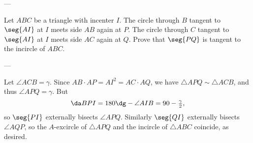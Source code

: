 
---

Let $ABC$ be a triangle with incenter $I$. The circle through $B$ tangent to $\seg{AI}$ at $I$ meets side $AB$ again at $P$. The circle through $C$ tangent to $\seg{AI}$ at $I$ meets side $AC$ again at $Q$. Prove that $\seg{PQ}$ is tangent to the incircle of $ABC$.

---

Let $\angle ACB=\gamma$. Since $AB\cdot AP=AI^2=AC\cdot AQ$, we have $\triangle APQ\sim\triangle ACB$, and thus $\angle APQ=\gamma$. But \[\da BPI=180\dg-\angle AIB=90-\tfrac\gamma2,\]
so $\seg{PI}$ externally bisects $\angle APQ$. Similarly $\seg{QI}$ externally bisects $\angle AQP$, so the $A$-excircle of $\triangle APQ$ and the incircle of $\triangle ABC$ coincide, as desired.
